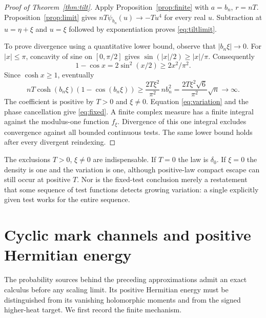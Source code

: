 \documentclass[11pt]{article}
\begin{document}
\begin{proof}[Proof of Theorem~\ref{thm:tilt}]
Apply Proposition~\ref{prop:finite} with $a=b_n$, $r=nT$.
Proposition~\ref{prop:limit} gives
$nT\psi_{b_n}(u)\to-Tu^4$ for every real $u$. Subtraction at
$u=\eta+\xi$ and $u=\xi$ followed by exponentiation proves
\eqref{eq:tiltlimit}.

To prove divergence using a quantitative lower bound, observe that
$|b_n\xi|\to0$. For $|x|\leq\pi$, concavity of sine on $[0,\pi/2]$
gives $\sin(|x|/2)\geq |x|/\pi$. Consequently
\[
 1-\cos x=2\sin^2(x/2)\geq2x^2/\pi^2.
\]
Since $\cosh x\geq1$, eventually
\begin{equation}\label{eq:growth}
 nT\cosh(b_n\xi)(1-\cos(b_n\xi))
 \geq\frac{2T\xi^2}{\pi^2}\,n b_n^2
 =\frac{2T\xi^2\sqrt6}{\pi^2}\sqrt n\longrightarrow\infty.
\end{equation}
The coefficient is positive by $T>0$ and $\xi\ne0$.
Equation \eqref{eq:variation} and the phase cancellation give
\eqref{eq:fixed}. A finite complex measure has a finite integral against
the modulus-one function $f_\xi$. Divergence of this one integral excludes
convergence against all bounded continuous tests. The same lower bound
holds after every divergent reindexing.
\end{proof}

The exclusions $T>0$, $\xi\ne0$ are indispensable. If $T=0$ the law is
$\delta_0$. If $\xi=0$ the density is one and the variation is one,
although positive-law compact escape can still occur at positive $T$.
Nor is the fixed-test conclusion merely a restatement that some sequence
of test functions detects growing variation: a single explicitly given
test works for the entire sequence.


\section{Cyclic mark channels and positive Hermitian energy}
The probability sources behind the preceding approximations admit an
exact calculus before any scaling limit. Its positive Hermitian energy
must be distinguished from its vanishing holomorphic moments and from
the signed higher-heat target. We first record the finite mechanism.
\end{document}
